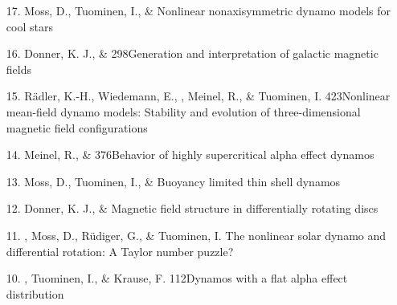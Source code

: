 \begin{itemize}
\item[17.]
Moss, D., Tuominen, I., \& \Brandenburg{}
{Nonlinear nonaxisymmetric dynamo models for cool stars}

\item[16.]
Donner, K. J., \& \Brandenburg{}
{298}{Generation and interpretation of galactic magnetic fields}

\item[15.]
R\"adler, K.-H., Wiedemann, E., 
\Brandenburg, Meinel, R., \& Tuominen, I.
{423}{Nonlinear mean-field dynamo models:
Stability and evolution of three-dimensional magnetic field configurations}

\item[14.]
Meinel, R., \& \Brandenburg{}
{376}{Behavior of highly supercritical alpha effect dynamos}

\item[13.]
Moss, D., Tuominen, I., \& \Brandenburg{}
{Buoyancy limited thin shell dynamos}

\item[12.]
Donner, K. J., \& \Brandenburg{}
{Magnetic field structure in differentially rotating discs}

\item[11.]
\Brandenburg, Moss, D., R\"udiger, G., \& Tuominen, I.
{The nonlinear solar dynamo and differential rotation: A Taylor number puzzle?}

\item[10.]
\Brandenburg, Tuominen, I., \& Krause, F.
{112}{Dynamos with a flat alpha effect distribution}


\end{itemize}
